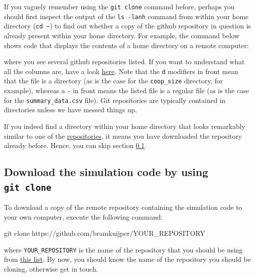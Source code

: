 \documentclass[
]{book}
\newenvironment{Shaded}{\begin{snugshade}}{\end{snugshade}}
\newcommand{\FunctionTok}[1]{\textcolor[rgb]{0.00,0.00,0.00}{#1}}
\newcommand{\NormalTok}[1]{#1}
\begin{document}
If you vaguely remember using the \texttt{git\ clone} command before, perhaps you should first inspect the output of the \texttt{ls\ -lanh} command from within your home directory (\texttt{cd\ \textasciitilde{}}) to find out whether a copy of the github repository in question is already present within your home directory. For example, the command below shows code that displays the contents of a home directory on a remote computer:

where you see several github repositories listed. If you want to understand what all the columns are, have a look \href{https://unix.stackexchange.com/a/103118}{here}. Note that the \texttt{d} modifiers in front mean that the file is a directory (as is the case for the \texttt{coop\_size} directory, for example), whereas a \texttt{-} in front means the listed file is a regular file (as is the case for the \texttt{summary\_data.csv} file). Git repositories are typically contained in directories unless we have messed things up.

If you indeed find a directory within your home directory that looks remarkably similar to one of the \href{https://github.com/bramkuijper?tab=repositories}{repositories}, it means you have downloaded the repository already before. Hence, you can skip section \ref{section:downloadgithub}.

\hypertarget{section:downloadgithub}{%
\subsection{\texorpdfstring{Download the simulation code by using \texttt{git\ clone}}{Download the simulation code by using git clone}}\label{section:downloadgithub}}

To download a copy of the remote repository containing the simulation code to your own computer, execute the following command:

\begin{Shaded}
\begin{Highlighting}[]
\FunctionTok{git}\NormalTok{ clone https://github.com/bramkuijper/YOUR\_REPOSITORY}
\end{Highlighting}
\end{Shaded}

where \texttt{YOUR\_REPOSITORY} is the name of the repository that you should be using from \href{https://github.com/bramkuijper?tab=repositories}{this list}. By now, you should know the name of the repository you should be cloning, otherwise get in touch.
\end{document}
